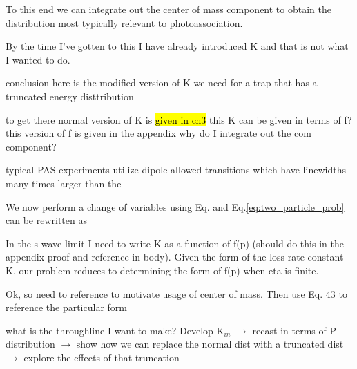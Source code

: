 To this end we can integrate out the center of mass component to obtain the distribution most typically relevant to photoassociation.

By the time I've gotten to this I have already introduced K and that is not what I wanted to do. 

conclusion
here is the modified version of K we need for a trap that has a truncated energy disttribution

to get there
normal version of K is \hl{given in ch3}
this K can be given in terms of f? 
this version of f is given in the appendix
	why do I integrate out the com component?

typical PAS experiments utilize dipole allowed transitions which have linewidths many times larger than the 

We now perform a change of variables using Eq. and Eq.\ref{eq:two_particle_prob} can be rewritten as 

In the s-wave limit I need to write K as a function of f(p) (should do this in the appendix proof and reference in body). Given the form of the loss rate constant K, our problem reduces to determining the form of f(p) when eta is finite.

Ok, so need to reference \cite{Ciuryo2004} to motivate usage of center of mass.
Then use \cite{Nicholson2015a} Eq. 43 to reference the particular form 


what is the throughline I want to make? Develop K$_{in}$ $\rightarrow$ recast in terms of P distribution $\rightarrow$ show how we can replace the normal dist with a truncated dist $\rightarrow$ explore the effects of that truncation 


